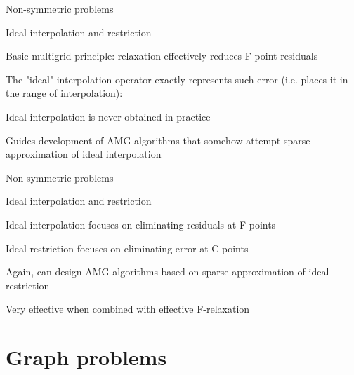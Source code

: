 \documentclass[18pt,xcolor=table]{beamer}
\begin{document}
\begin{frame}{Non-symmetric problems}
\begin{block}{Ideal interpolation and restriction}
\bit
\item Basic multigrid principle: relaxation effectively reduces F-point residuals
\item The "ideal" interpolation operator exactly represents such error (i.e. places it in the range of interpolation):
\item Ideal interpolation is never obtained in practice
\item Guides development of AMG algorithms that somehow attempt sparse approximation of ideal interpolation
\eit
\end{block}
\end{frame}

\begin{frame}{Non-symmetric problems}
\begin{block}{Ideal interpolation and restriction}
\bit
\item Ideal interpolation focuses on eliminating residuals at F-points
\item Ideal restriction focuses on eliminating error at C-points
\item Again, can design AMG algorithms based on sparse approximation of ideal restriction
\item Very effective when combined with effective F-relaxation
\eit
\end{block}
\end{frame}


\section{Graph problems}
\end{document}
